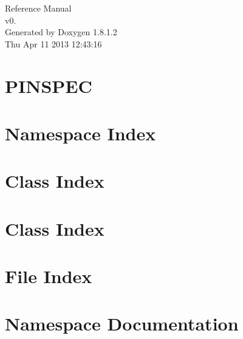 \documentclass{book}
\begin{document}
\hypersetup{pageanchor=false,citecolor=blue}
\begin{titlepage}
\vspace*{7cm}
\begin{center}
{\Large Reference Manual\\[1ex]\large v0. }\\
\vspace*{1cm}
{\large Generated by Doxygen 1.8.1.2}\\
\vspace*{0.5cm}
{\small Thu Apr 11 2013 12:43:16}\\
\end{center}
\end{titlepage}
\clearemptydoublepage
{}
\tableofcontents
\clearemptydoublepage
{}
\hypersetup{pageanchor=true,citecolor=blue}
\chapter{P\-I\-N\-S\-P\-E\-C}
\label{md_README}
\hypertarget{md_README}{}

\chapter{Namespace Index}

\chapter{Class Index}

\chapter{Class Index}

\chapter{File Index}

\chapter{Namespace Documentation}




\end{document}
